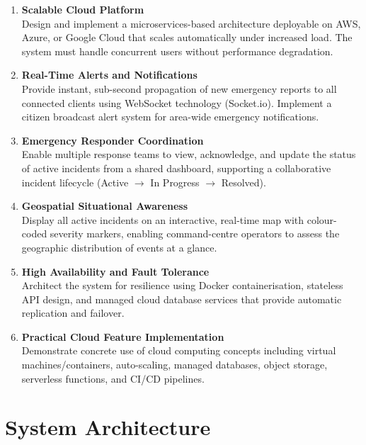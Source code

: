 \documentclass[12pt, a4paper]{report}
\begin{document}
\begin{enumerate}[leftmargin=*, label=\textbf{O\arabic*.}]

  \item \textbf{Scalable Cloud Platform}\\
  Design and implement a microservices-based architecture deployable on AWS, Azure, or Google Cloud that scales automatically under increased load. The system must handle concurrent users without performance degradation.

  \item \textbf{Real-Time Alerts and Notifications}\\
  Provide instant, sub-second propagation of new emergency reports to all connected clients using WebSocket technology (Socket.io). Implement a citizen broadcast alert system for area-wide emergency notifications.

  \item \textbf{Emergency Responder Coordination}\\
  Enable multiple response teams to view, acknowledge, and update the status of active incidents from a shared dashboard, supporting a collaborative incident lifecycle (Active $\rightarrow$ In Progress $\rightarrow$ Resolved).

  \item \textbf{Geospatial Situational Awareness}\\
  Display all active incidents on an interactive, real-time map with colour-coded severity markers, enabling command-centre operators to assess the geographic distribution of events at a glance.

  \item \textbf{High Availability and Fault Tolerance}\\
  Architect the system for resilience using Docker containerisation, stateless API design, and managed cloud database services that provide automatic replication and failover.

  \item \textbf{Practical Cloud Feature Implementation}\\
  Demonstrate concrete use of cloud computing concepts including virtual machines/containers, auto-scaling, managed databases, object storage, serverless functions, and CI/CD pipelines.

\end{enumerate}

\chapter{System Architecture}
\end{document}
